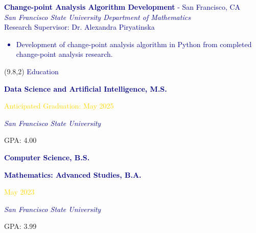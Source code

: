 \documentclass[hidelinks, 10pt]{article}
\newcommand{\bodyspacing}{1mm}
\begin{document}
\begin{textblock}{8.75}
    \vspace{\bodyspacing}

    \textcolor{navy}{{\textbf{Change-point Analysis Algorithm Development} - San Francisco, CA}\\
        \emph{San Francisco State University Department of Mathematics}\\
        Research Supervisor: Dr. Alexandra Piryatinska
        \begin{itemize}[leftmargin=5mm]
            \setlength\itemsep{-0.25em}
            \item Development of change-point analysis algorithm in Python from
                  completed change-point analysis research.
        \end{itemize}}
\end{textblock}


\begin{textblock}{4}(9.8,2)
    \setlength{\parindent}{0cm}
    \large{\textcolor{navy}{Education}}

    \vspace{2mm}

    \footnotesize\textcolor{navy}{\scriptsize\textbf{Data Science and Artificial
            Intelligence, M.S.}}

    \vspace{0.5mm}

    \scriptsize\textcolor{gold}{\scriptsize Anticipated Graduation: May 2025}

    \vspace{0.5mm}

    \scriptsize\textcolor{navy}{\scriptsize\emph{San Francisco State University}}

    \vspace{0.5mm}

    \scriptsize{\scriptsize GPA: 4.00}

    \vspace{2mm}

    \footnotesize\textcolor{navy}{\scriptsize\textbf{Computer Science, B.S.}}

    \footnotesize\textcolor{navy}{\scriptsize\textbf{Mathematics: Advanced Studies, B.A.}}

    \vspace{0.5mm}

    \scriptsize\textcolor{gold}{\scriptsize May 2023}

    \vspace{0.5mm}

    \scriptsize\textcolor{navy}{\scriptsize\emph{San Francisco State University}}

    \vspace{0.5mm}

    \scriptsize{\scriptsize GPA: 3.99}
\end{textblock}
\end{document}
